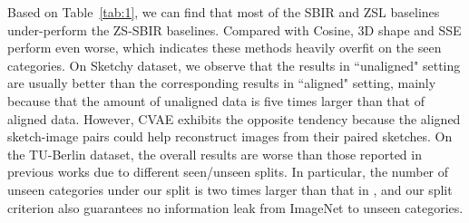\documentclass[10pt,twocolumn,letterpaper]{article}
\begin{document}

\begin{table}[]
\caption{Ablation Studies of our method on Sketchy dataset.}
\label{tab:2}
\vspace{-14pt}
\end{table}


Based on Table~\ref{tab:1}, we can find that most of the SBIR and ZSL baselines under-perform the ZS-SBIR baselines. 
Compared with Cosine, 3D shape \cite{wang2015sketch} and SSE \cite{zhang2015zero} perform even worse, which indicates these methods heavily overfit on the seen categories. 
On Sketchy dataset, we observe that the results in ``unaligned" setting are usually better than the corresponding results in ``aligned" setting, mainly because that the amount of unaligned data is five times larger than that of aligned data.
However, CVAE exhibits the opposite tendency because the aligned sketch-image pairs could help reconstruct images from their paired sketches. 
On the TU-Berlin dataset, the overall results are worse than those reported in previous works \cite{liu2019semantic, dutta2019semantically} due to different seen/unseen splits. 
In particular, the number of unseen categories under our split is two times larger than that in  \cite{liu2019semantic, dutta2019semantically}, and our split criterion also guarantees no information leak from ImageNet to unseen categories.
\end{document}
